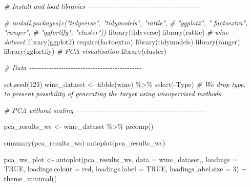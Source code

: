 \documentclass[
]{book}
\newenvironment{Shaded}{\begin{snugshade}}{\end{snugshade}}
\newcommand{\AttributeTok}[1]{\textcolor[rgb]{0.77,0.63,0.00}{#1}}
\newcommand{\CommentTok}[1]{\textcolor[rgb]{0.56,0.35,0.01}{\textit{#1}}}
\newcommand{\ConstantTok}[1]{\textcolor[rgb]{0.00,0.00,0.00}{#1}}
\newcommand{\DecValTok}[1]{\textcolor[rgb]{0.00,0.00,0.81}{#1}}
\newcommand{\FunctionTok}[1]{\textcolor[rgb]{0.00,0.00,0.00}{#1}}
\newcommand{\NormalTok}[1]{#1}
\newcommand{\OtherTok}[1]{\textcolor[rgb]{0.56,0.35,0.01}{#1}}
\newcommand{\SpecialCharTok}[1]{\textcolor[rgb]{0.00,0.00,0.00}{#1}}
\newcommand{\StringTok}[1]{\textcolor[rgb]{0.31,0.60,0.02}{#1}}
\begin{document}
\begin{Shaded}
\begin{Highlighting}[]
\CommentTok{\# Install and load libraries {-}{-}{-}{-}{-}{-}{-}{-}{-}{-}{-}{-}{-}{-}{-}{-}{-}{-}{-}{-}{-}{-}{-}{-}{-}{-}{-}{-}{-}{-}{-}{-}{-}{-}{-}{-}{-}{-}{-}{-}{-}{-}{-}{-}{-}{-}}

\CommentTok{\# install.packages(c("tidyverse", "tidymodels", "rattle",}
\CommentTok{\#                    "ggplot2", " factoextra", "ranger",}
\CommentTok{\#                    "ggfortify", "cluster"))}
\FunctionTok{library}\NormalTok{(tidyverse)}
\FunctionTok{library}\NormalTok{(rattle) }\CommentTok{\# wine dataset}
\FunctionTok{library}\NormalTok{(ggplot2)}
\FunctionTok{require}\NormalTok{(factoextra)}
\FunctionTok{library}\NormalTok{(tidymodels)}
\FunctionTok{library}\NormalTok{(ranger)}
\FunctionTok{library}\NormalTok{(ggfortify) }\CommentTok{\# PCA visualization}
\FunctionTok{library}\NormalTok{(cluster)}

\CommentTok{\# Data {-}{-}{-}{-}{-}{-}{-}{-}{-}{-}{-}{-}{-}{-}{-}{-}{-}{-}{-}{-}{-}{-}{-}{-}{-}{-}{-}{-}{-}{-}{-}{-}{-}{-}{-}{-}{-}{-}{-}{-}{-}{-}{-}{-}{-}{-}}

\FunctionTok{set.seed}\NormalTok{(}\DecValTok{123}\NormalTok{)}
\NormalTok{wine\_dataset }\OtherTok{\textless{}{-}} \FunctionTok{tibble}\NormalTok{(wine) }\SpecialCharTok{\%\textgreater{}\%} 
  \FunctionTok{select}\NormalTok{(}\SpecialCharTok{{-}}\NormalTok{Type) }\CommentTok{\# We drop type, to present possibility of generating the target using unsupervised methods}


\CommentTok{\# PCA without scaling {-}{-}{-}{-}{-}{-}{-}{-}{-}{-}{-}{-}{-}{-}{-}{-}{-}{-}{-}{-}{-}{-}{-}{-}{-}{-}{-}{-}{-}{-}{-}{-}{-}{-}{-}{-}{-}{-}{-}{-}{-}{-}{-}{-}{-}{-}{-}{-}{-}{-}{-}{-}{-}}

\NormalTok{pca\_results\_ws }\OtherTok{\textless{}{-}}\NormalTok{ wine\_dataset }\SpecialCharTok{\%\textgreater{}\%}
  \FunctionTok{prcomp}\NormalTok{()}

\FunctionTok{summary}\NormalTok{(pca\_results\_ws)}
\FunctionTok{autoplot}\NormalTok{(pca\_results\_ws)}

\NormalTok{pca\_ws\_plot }\OtherTok{\textless{}{-}} \FunctionTok{autoplot}\NormalTok{(pca\_results\_ws, }\AttributeTok{data =}\NormalTok{ wine\_dataset,,}
                   \AttributeTok{loadings =} \ConstantTok{TRUE}\NormalTok{, }\AttributeTok{loadings.colour =} \StringTok{\textquotesingle{}red\textquotesingle{}}\NormalTok{,}
                   \AttributeTok{loadings.label =} \ConstantTok{TRUE}\NormalTok{, }\AttributeTok{loadings.label.size =} \DecValTok{3}\NormalTok{) }\SpecialCharTok{+}
  \FunctionTok{theme\_minimal}\NormalTok{()}


\end{Highlighting}
\end{Shaded}
\end{document}

